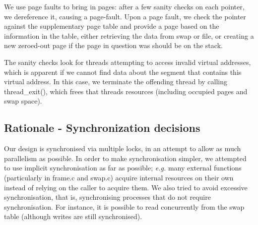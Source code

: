 We use page faults to bring in pages: after a few sanity checks on each pointer, we dereference it, causing a page-fault.
Upon a page fault, we check the pointer against the supplementary page table and provide a page based on the information in the table, either retrieving the data from swap or file, or creating a new zeroed-out page if the page in question was should be on the stack.

The sanity checks look for threads attempting to access invalid virtual addresses, which is apparent if we cannot find data about the segment that contains this virtual address. In this case, we terminate the offending thread by calling thread\_exit(), which frees that threads resources (including occupied pages and swap space).

\subsection{Rationale - Synchronization decisions}

Our design is synchronised via multiple locks, in an attempt to allow as much parallelism as possible.
In order to make synchronisation simpler, we attempted to use implicit synchronisation as far as possible; \textit{e.g.} many external functions (particularly in frame.c and swap.c) acquire internal resources on their own instead of relying on the caller to acquire them.
We also tried to avoid excessive synchronisation, that is, synchronising processes that do not require synchronisation. For instance, it is possible to read concurrently from the swap table (although writes are still synchronised).
